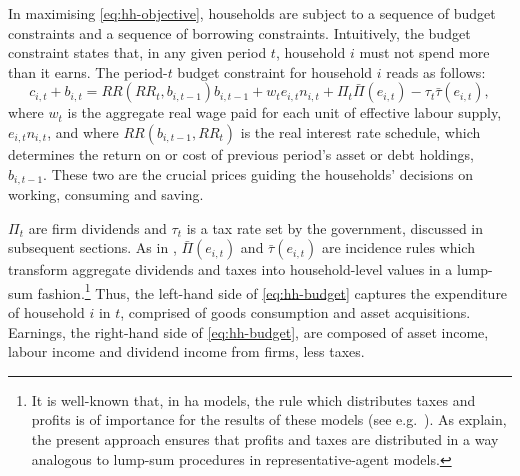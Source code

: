 \documentclass[12pt]{article} %
\numberwithin{equation}{section} %
\numberwithin{figure}{section}
\numberwithin{table}{section}
\begin{document}
In maximising \eqref{eq:hh-objective}, households are subject to a sequence of budget constraints and a sequence of borrowing constraints. Intuitively, the budget constraint states that, in any given period $t$, household $i$ must not spend more than it earns. The period-$t$ budget constraint for household $i$ reads as follows: 
\begin{equation}
c_{i,t} + b_{i,t} = RR (RR_t, b_{i,t-1}) b_{i,t-1} + w_t e_{i,t} n_{i,t} + \Pi_t \bar{\Pi} (e_{i,t}) - \tau_t \bar{\tau} (e_{i,t}), \label{eq:hh-budget}
\end{equation}
where $w_t$ is the aggregate real wage paid for each unit of effective labour supply, $e_{i,t} n_{i,t}$, and where $RR (b_{i,t-1}, RR_t)$ is the real interest rate schedule, which determines the return on or cost of previous period's asset or debt holdings, $b_{i,t-1}$. These two are the crucial prices guiding the households' decisions on working, consuming and saving. 

$\Pi_t$ are firm dividends and $\tau_t$ is a tax rate set by the government, discussed in subsequent sections. As in \textcite{mckay2016}, $\bar{\Pi} (e_{i,t})$ and $\bar{\tau} (e_{i,t})$ are incidence rules which transform aggregate dividends and taxes into household-level values in a lump-sum fashion.\footnote{It is well-known that, in \Gls{ha} models, the rule which distributes taxes and profits is of importance for the results of these models (see e.g.~\cite{kaplan2018}). As \textcite{mckay2016} explain, the present approach ensures that profits and taxes are distributed in a way analogous to lump-sum procedures in representative-agent models.} Thus, the left-hand side of \eqref{eq:hh-budget} captures the expenditure of household $i$ in $t$, comprised of goods consumption and asset acquisitions. Earnings, the right-hand side of \eqref{eq:hh-budget}, are composed of asset income, labour income and dividend income from firms, less taxes.

\end{document}
